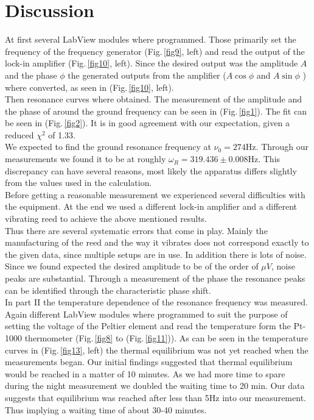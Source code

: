 \section{Discussion}
At first several LabView modules where programmed. Those primarily set the frequency of the frequency generator (Fig.\,\ref{fig9}, left) and read the output of the lock-in amplifier (Fig.\,\ref{fig10}, left). Since the desired output was the amplitude $A$ and the phase $\phi$ the generated outputs from the amplifier ($A \cos \phi$ and $A \sin \phi$ ) where converted, as seen in (Fig.\,\ref{fig10}, left).\\
Then resonance curves where obtained. The measurement of the amplitude and the phase of around the ground frequency can be seen in (Fig.\,\ref{fig1}). The fit can be seen in (Fig.\,\ref{fig2}). It is in good agreement with our expectation, given a reduced $\chi^2$ of 1.33.\\
We expected to find the ground resonance frequency at $\nu_0 = 274 \text{Hz}$. Through our measurements we found it to be at roughly $\omega_R = 319.436 \pm 0.008$Hz. This discrepancy can have several reasons, most likely the apparatus differs slightly from the values used in the calculation.\\
Before getting a reasonable measurement we experienced several difficulties with the equipment. At the end we used a different lock-in amplifier and a different vibrating reed to achieve the above mentioned results.\\
Thus there are several systematic errors that come in play. Mainly the manufacturing of the reed and the way it vibrates does not correspond exactly to the given data, since multiple setups are in use. In addition there is lots of noise. Since we found expected the desired amplitude to be of the order of $\mu V$, noise peaks are substantial. Through a measurement of the phase the resonance peaks can be identified through the characteristic phase shift.  
\\
In part II the temperature dependence of the resonance frequency was measured. Again different LabView modules where programmed to suit the purpose of setting the voltage of the Peltier element and read the temperature form the Pt-1000 thermometer (Fig.\,\ref{fig8} to (Fig.\,\ref{fig11})). As can be seen in the temperature curves in (Fig.\,\ref{fig13}, left) the thermal equilibrium was not yet reached when the measurements began. Our initial findings suggested that thermal equilibrium would be reached in a matter of 10 minutes. As we had more time to spare during the night measurement we doubled the waiting time to 20 min. Our data suggests that equilibrium was reached after less than 5Hz into our measurement. Thus implying a waiting time of about 30-40 minutes.\\

